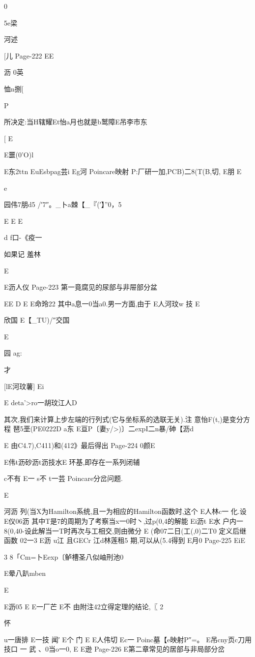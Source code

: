 {{{{{{{{{{{{{0

5e梁

河述

[儿
Page-222
EE

沥
0英

恤n捌[

P

所决定:当H辖耀Et怡a月也就是b鹫障E吊李市东

[
E

E噩(0'O)l

E东2ttn
EuEsbpag芸i
Eg河
Poincare映射
P:厂研一加,PCB)二8(T(B,切,
E朋
E

e

园伟7朋d5
/′7″。_卜a棘【_『(′】”0，5

E
E
E

d
f口-《疫一

如果记
羞林

E

E沥人仪
Page-223
第一竟腐见的尿部与非屉部分盆

EE
D
E
E命玲22
其中a息一0当a0.男一方面,由于
E人河玟w
技
E

欣国
E【_TU)/″交国

E

园
ag:

才

[lE河玟薯]
Ei

E
deta'>ro一胡玟江人D

其次,我们来计算上步左端的行列式(它与坐标系的选联无关).注
意怡F(t,)是变分方程
琶5垩(PE0222D
a东
E亘P〔妻y/>)〕二expI二n暴/砷【沥d

E
由C4.7),C411)和(412》最后得出
Page-224
0颜E

E伟t沥砂沥t沥技水E
环基,即存在一系列闭辅

c不有
E一
s不
t一芸
Poincare分岔问题.

E

河沥
列(当X为Hamilton系统,且一为相应的Hamilton函数时,这个
E人林c一
化.设
E仪06沥
其中T是7的周期为了考察当x一0时丶,过p(0,4的解能
Ei沥t
E水
户内一8(0,40-设此解当一T时再次与工相交,则由微分
E
(命07二日(工(,0)二T0
定义后继函数
02一3
E沥
u江
且GECr
江d林莲租5
期,可以从(5.4得到
E月0
Page-225
EiE

3
8「Cm=卜Eexp〔鲈槽圣八似岫刑池0

E晕八趴mben

E

E沥05
E
E一厂芒
E不
由附注42立得定理的结论,〖
2

怀

u一唐排
E一技
闻′
E个
门
E
E人伟切
Ec一
Poinc墓【e映射P″=。
E吊cny页c刀用
技口
一
武
、0当o一0,
E
E逊
Page-226
E第二章常见的居部与非局部分岔

}}}}}}}}}}}}}
